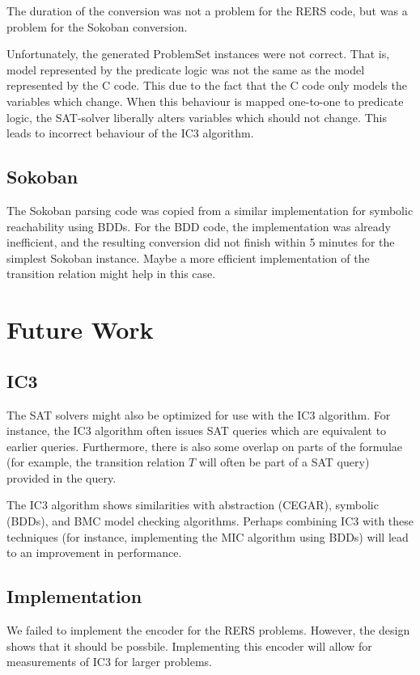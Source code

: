 \documentclass[a4paper]{article}
\begin{document}
The duration of the conversion was not a problem for the RERS code, but was a problem for the Sokoban conversion.

Unfortunately, the generated ProblemSet instances were not correct.
That is, model represented by the predicate logic was not the same as the model represented by the C code. This due to the fact that the C code only models the variables which change. When this behaviour is mapped one-to-one to predicate logic, the SAT-solver liberally alters variables which should not change. This leads to incorrect behaviour of the IC3 algorithm.

\subsection{Sokoban}
The Sokoban parsing code was copied from a similar implementation for symbolic reachability using BDDs. For the BDD code, the implementation was already inefficient, and the resulting conversion did not finish within 5 minutes for the simplest Sokoban instance. Maybe a more efficient implementation of the transition relation might help in this case.

\section{Future Work}
\subsection{IC3}
The SAT solvers might also be optimized for use with the IC3 algorithm. For instance, the IC3 algorithm often issues SAT queries which are equivalent to earlier queries. Furthermore, there is also some overlap on parts of the formulae (for example, the transition relation $T$ will often be part of a SAT query) provided in the query.

The IC3 algorithm shows similarities with abstraction (CEGAR), symbolic (BDDs), and BMC model checking algorithms. Perhaps combining IC3 with these techniques (for instance, implementing the MIC algorithm using BDDs) will lead to an improvement in performance.

\subsection{Implementation}
We failed to implement the encoder for the RERS problems. However, the design shows that it should be possbile. Implementing this encoder will allow for measurements of IC3 for larger problems.
\end{document}
